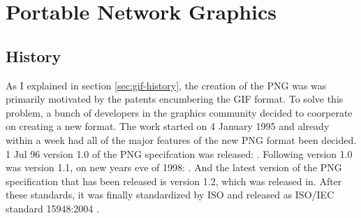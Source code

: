 \begin{comment}
  
\end{comment}


\chapter{Portable Network Graphics}
\label{cha:png}

\section{History}

As I explained in section \ref{sec:gif-history}, the creation of the
PNG was was primarily motivated by the patents encumbering the GIF
format. To solve this problem, a bunch of developers in the graphics
community decided to coorperate on creating a new format. The work
started on 4 January 1995 and already within a week had all of the
major features of the new PNG format been decided. 1 Jul 96 version
1.0 of the PNG specifcation was released:
\cite{boutel:_png_portab_networ_graph_specif_version1}. Following
version 1.0 was version 1.1, on new years eve of 1998:
\cite{boutel:_png_portab_networ_graph_specif_version11}. And the
latest version of the PNG specification that has been released is
version 1.2, which was released in. After these standards, it was
finally standardized by ISO and released as ISO/IEC standard
15948:2004 \cite{iso/eic04:_iso_iec_png,roelofs09:_histor_portab_networ_graph_png_format,roelofs99:_png,roelofs:_portab_networ_graph_main}.

  \cite{sivonen:_sad_story_png_gamma_correc}



